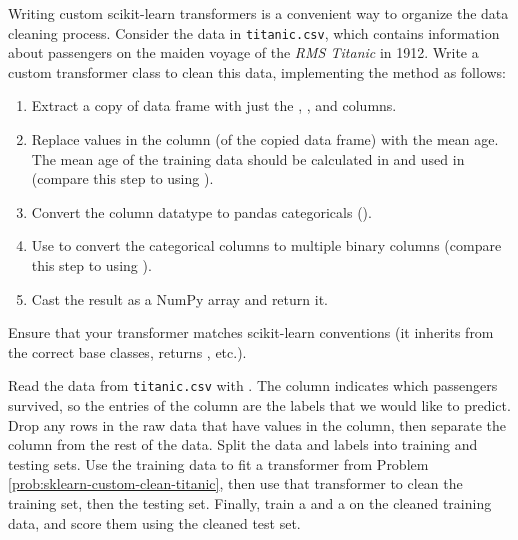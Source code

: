\begin{problem} %
\label{prob:sklearn-custom-clean-titanic}
Writing custom scikit-learn transformers is a convenient way to organize the data cleaning process.
Consider the data in \texttt{titanic.csv}, which contains information about passengers on the maiden voyage of the \emph{RMS Titanic} in 1912.
Write a custom transformer class to clean this data, implementing the  method as follows:
\begin{enumerate}
\item Extract a copy of data frame with just the , , and  columns.
\item Replace  values in the  column (of the copied data frame) with the mean age.
The mean age of the training data should be calculated in  and used in 
(compare this step to using ).
\item Convert the  column datatype to pandas categoricals ().
\item Use  to convert the categorical columns to multiple binary columns (compare this step to using ).
\item Cast the result as a NumPy array and return it.
\end{enumerate}
Ensure that your transformer matches scikit-learn conventions (it inherits from the correct base classes,  returns , etc.).
\end{problem}

\begin{problem} %
\label{prob:sklearn-read-and-classify}
Read the data from \texttt{titanic.csv} with .
The  column indicates which passengers survived, so the entries of the column are the labels that we would like to predict.
Drop any rows in the raw data that have  values in the  column, then separate the column from the rest of the data.
Split the data and labels into training and testing sets.
Use the training data to fit a transformer from Problem \ref{prob:sklearn-custom-clean-titanic}, then use that transformer to clean the training set, then the testing set.
Finally, train a  and a  on the cleaned training data, and score them using the cleaned test set.
\end{problem}

